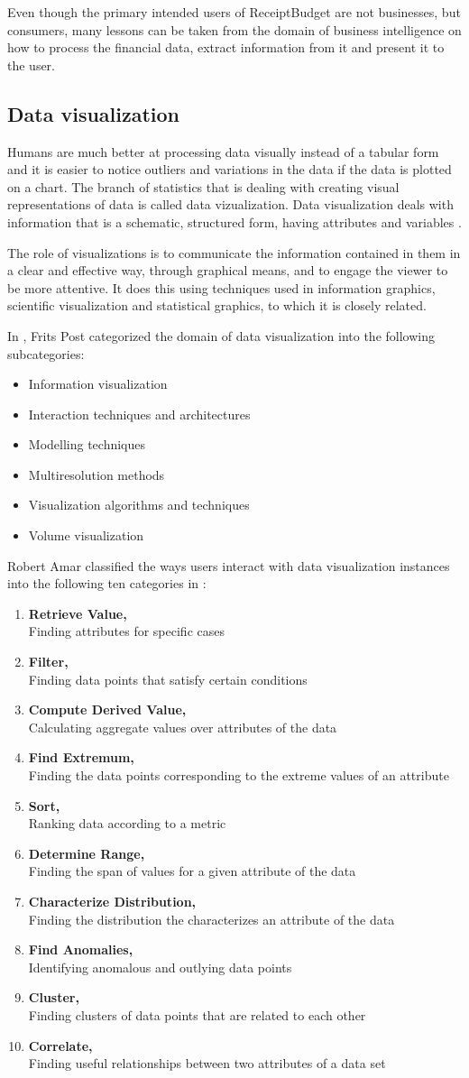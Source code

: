 Even though the primary intended users of ReceiptBudget are not businesses, but consumers, many lessons can be taken from the domain of business intelligence on how to process the financial data, extract information from it and present it to the user.  

\subsection{Data visualization}
Humans are much better at processing data visually instead of a tabular form and it is easier to notice outliers and variations in the data if the data is plotted on a chart\cite{daniel1959use}. The branch of statistics that is dealing with creating visual representations of data is called data vizualization. Data visualization deals with information that is a schematic, structured form, having attributes and variables \cite{friendly2008milestones}. 

The role of visualizations is to communicate the information contained in them in a clear and effective way, through graphical means, and to engage the viewer to be more attentive. It does this using techniques used in information graphics, scientific visualization and statistical graphics, to which it is closely related. 

In \cite{post2003data}, Frits Post categorized the domain of data visualization into the following subcategories:

\begin{itemize}
	\item Information visualization
	\item Interaction techniques and architectures
	\item Modelling techniques
	\item Multiresolution methods
	\item Visualization algorithms and techniques
	\item Volume visualization
\end{itemize} 


Robert Amar classified the ways users interact with data visualization instances into the following ten categories in \cite{amar2005low}:

\newcommand\litem[1]{\item{\bfseries #1,\\}}
\begin{enumerate}
\litem{Retrieve Value} Finding attributes for specific cases
\litem{Filter} Finding data points that satisfy certain conditions
\litem{Compute Derived Value} Calculating aggregate values over attributes of the data
\litem{Find Extremum} Finding the data points corresponding to the extreme values of an attribute
\litem{Sort} Ranking data according to a metric
\litem{Determine Range} Finding the span of values for a given attribute of the data
\litem{Characterize Distribution} Finding the distribution the characterizes an attribute of the data
\litem{Find Anomalies} Identifying anomalous and outlying data points
\litem{Cluster} Finding clusters of data points that are related to each other
\litem{Correlate} Finding useful relationships between two attributes of a data set
\end{enumerate}


